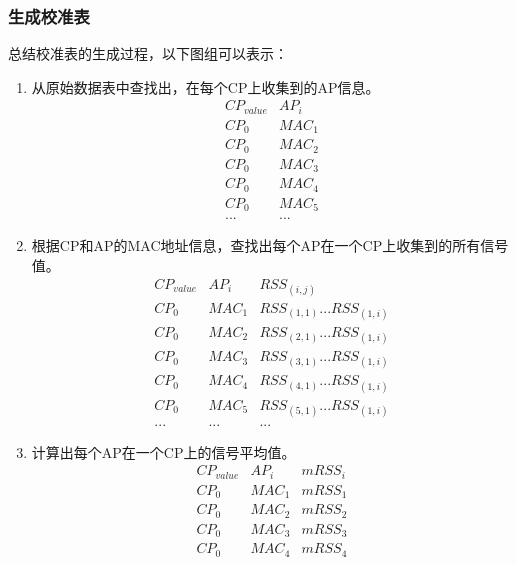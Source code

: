 \documentclass[UTF8, twocolumn ]{ctexart}
\begin{document}
\subsubsection{生成校准表}
总结校准表的生成过程，以下图组可以表示：

\begin{enumerate}
\item 从原始数据表中查找出，在每个CP上收集到的AP信息。
  \begin{displaymath}
    \begin{array}{c|c}
      CP_{value} & AP_{i} \\ \hline
      CP_{0} & MAC_{1} \\
      CP_{0} & MAC_{2} \\
      CP_{0} & MAC_{3} \\
      CP_{0} & MAC_{4} \\
      CP_{0} & MAC_{5} \\
      ... & ...
    \end{array}
  \end{displaymath}
\item 根据CP和AP的MAC地址信息，查找出每个AP在一个CP上收集到的所有信号值。
  \begin{displaymath}
    \begin{array}{c|c|c}
      CP_{value} & AP_{i} & RSS_{(i,j)} \\ \hline
      CP_{0} & MAC_{1} & RSS_{(1,1)}...RSS_{(1,i)} \\
      CP_{0} & MAC_{2} & RSS_{(2,1)}...RSS_{(1,i)} \\
      CP_{0} & MAC_{3} & RSS_{(3,1)}...RSS_{(1,i)} \\
      CP_{0} & MAC_{4} & RSS_{(4,1)}...RSS_{(1,i)} \\
      CP_{0} & MAC_{5} & RSS_{(5,1)}...RSS_{(1,i)} \\
      ... & ... & ...
    \end{array}
  \end{displaymath}
\item 计算出每个AP在一个CP上的信号平均值。
  \begin{displaymath}
    \begin{array}{c|c|c}
      CP_{value} & AP_{i} & mRSS_{i} \\ \hline
      CP_{0} & MAC_{1} & mRSS_{1} \\
      CP_{0} & MAC_{2} & mRSS_{2} \\
      CP_{0} & MAC_{3} & mRSS_{3} \\
      CP_{0} & MAC_{4} & mRSS_{4} \\

\end{array}
\end{displaymath}
\end{enumerate}
\end{document}
